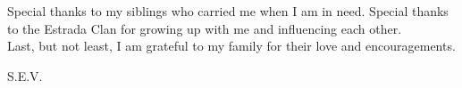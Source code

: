 \documentclass[12pt]{report}			%
\renewcommand{\chaptermark}[1]{ \markboth{#1}{} }
\begin{document}
Special thanks to my siblings who carried me when I am in need. Special thanks to the Estrada Clan for growing up with me and influencing each other. \ifnotUCFormat \\ \fi Last, but not least, I am grateful to my family for their love and encouragements. \ifnotUCFormat \\ \fi

\begin{flushright}
S.E.V.
\end{flushright}

\newpage
\fi

\ifnotAbstractOnly

\rhead{\footnotesize\capitalisewords{\leftmark}{ }\thepage}
\renewcommand{\contentsname}{Table of Contents}

\renewcommand{\thechapter} {\arabic{chapter}}
\renewcommand{\thesection} {\arabic{chapter}.\arabic{section}}
\renewcommand{\thesubsection}{\thesection.\arabic{subsection}}
\renewcommand{\thesubsubsection}{\thesubsection.\alph{subsubsection}}

\renewcommand{\thefigure}{\arabic{chapter}.\arabic{figure}}
\renewcommand{\thetable}{\arabic{chapter}.\arabic{table}}

\ifnotUCFormat
\else
	\renewcommand{\thechapter} {\arabic{chapter}}
	\renewcommand{\thesection} {\hspace{-0.45in}}
	\renewcommand{\thesubsection}{\hspace{-1em}}
	\renewcommand{\thesubsubsection}{\thesubsection.\alph{subsubsection}}

	\renewcommand{\thefigure}{\arabic{figure}}
	\renewcommand{\thetable}{\arabic{table}}
\fi


\tableofcontents

\newpage
\setcounter{tocdepth}{2}
\renewcommand{\contentsname}{List of Figures}
\listoffigures 

\newpage
{}
\chaptermark{List of Tables}
\listoftables
\clearpage

\ifnotUCFormat
\else
\fi
\end{document}
